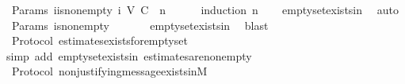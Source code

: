 \begin{isabellebody}
%
\isadelimproof
\isanewline
%
\endisadelimproof
\isanewline
{}\isamarkupfalse%
\ {\isacharparenleft}\ Params{\isacharparenright}\ {\isasymSigma}i{\isacharunderscore}is{\isacharunderscore}non{\isacharunderscore}empty{\isacharcolon}\ {\isachardoublequoteopen}{\isasymSigma}i\ {\isacharparenleft}V{\isacharcomma}\ C{\isacharcomma}\ {\isasymepsilon}{\isacharparenright}\ n\ {\isasymnoteq}\ {\isasymemptyset}{\isachardoublequoteclose}\isanewline
%
\isadelimproof
\ \ %
\endisadelimproof
%
\isatagproof
{}\isamarkupfalse%
\ {\isacharparenleft}induction\ n{\isacharparenright}\isanewline
\ \ \isamarkupfalse%
\ empty{\isacharunderscore}set{\isacharunderscore}exists{\isacharunderscore}in{\isacharunderscore}{\isasymSigma}{\isacharunderscore}{}\ \isamarkupfalse%
\ auto%
\endisatagproof
{\isafoldproof}%
%
\isadelimproof
\isanewline
%
\endisadelimproof
\isanewline
{}\isamarkupfalse%
\ {\isacharparenleft}\ Params{\isacharparenright}\ {\isasymSigma}is{\isacharunderscore}non{\isacharunderscore}empty{\isacharcolon}\ {\isachardoublequoteopen}{\isasymSigma}\ {\isasymnoteq}\ {\isasymemptyset}{\isachardoublequoteclose}\isanewline
%
\isadelimproof
\ \ %
\endisadelimproof
%
\isatagproof
{}\isamarkupfalse%
\ empty{\isacharunderscore}set{\isacharunderscore}exists{\isacharunderscore}in{\isacharunderscore}{\isasymSigma}\ \isamarkupfalse%
\ blast%
\endisatagproof
{\isafoldproof}%
%
\isadelimproof
\isanewline
%
\endisadelimproof
\isanewline
{}\isamarkupfalse%
\ {\isacharparenleft}\ Protocol{\isacharparenright}\ estimates{\isacharunderscore}exists{\isacharunderscore}for{\isacharunderscore}empty{\isacharunderscore}set\ {\isacharcolon}\isanewline
\ \ {\isachardoublequoteopen}{\isasymepsilon}\ {\isasymemptyset}\ {\isasymnoteq}\ {\isasymemptyset}{\isachardoublequoteclose}\isanewline
%
\isadelimproof
\ \ %
\endisadelimproof
%
\isatagproof
{}\isamarkupfalse%
\ {\isacharparenleft}simp\ add{\isacharcolon}\ empty{\isacharunderscore}set{\isacharunderscore}exists{\isacharunderscore}in{\isacharunderscore}{\isasymSigma}\ estimates{\isacharunderscore}are{\isacharunderscore}non{\isacharunderscore}empty{\isacharparenright}%
\endisatagproof
{\isafoldproof}%
%
\isadelimproof
\isanewline
%
\endisadelimproof
\isanewline
{}\isamarkupfalse%
\ {\isacharparenleft}\ Protocol{\isacharparenright}\ non{\isacharunderscore}justifying{\isacharunderscore}message{\isacharunderscore}exists{\isacharunderscore}in{\isacharunderscore}M{\isacharunderscore}{}{\isacharcolon}\ \isanewline

\end{isabellebody}

